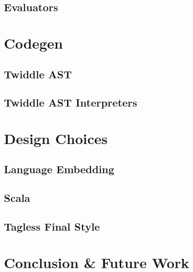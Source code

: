 \documentclass{article}
\begin{document}
\subsection{Evaluators}
\section{Codegen}
\subsection{Twiddle AST}
\subsection{Twiddle AST Interpreters}
\section{Design Choices}
\subsection{Language Embedding}
\subsection{Scala}
\subsection{Tagless Final Style}\label{subsec:tagless}
\section{Conclusion \& Future Work}



\end{document}
